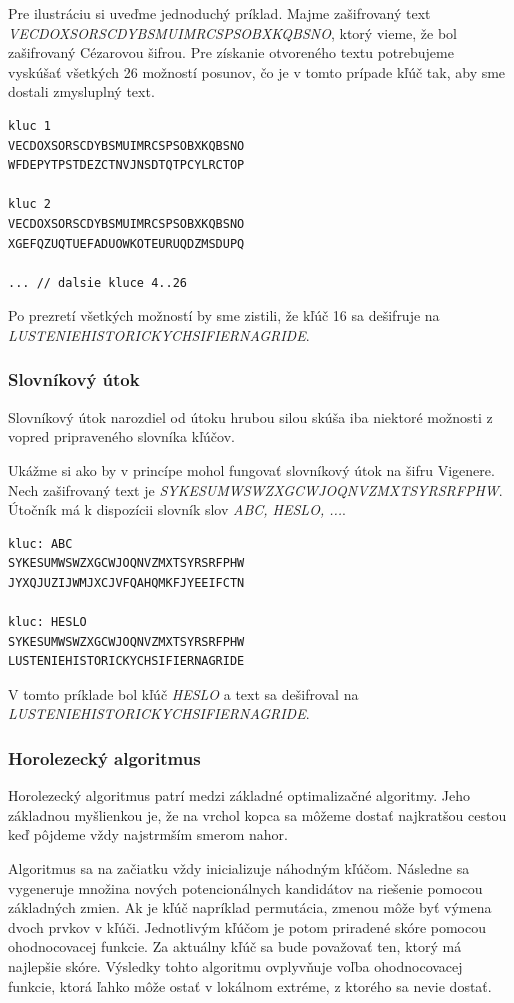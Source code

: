Pre ilustráciu si uveďme jednoduchý príklad. Majme zašifrovaný text \textit{VECDOXSORSCDYBSMUIMRCSPSOBXKQBSNO}, ktorý vieme,
že bol zašifrovaný Cézarovou šifrou.
Pre získanie otvoreného textu potrebujeme vyskúšať všetkých 26 možností posunov, čo je v tomto prípade kľúč tak, aby sme dostali zmysluplný text.

\begin{lstlisting}
kluc 1
VECDOXSORSCDYBSMUIMRCSPSOBXKQBSNO
WFDEPYTPSTDEZCTNVJNSDTQTPCYLRCTOP
  
kluc 2
VECDOXSORSCDYBSMUIMRCSPSOBXKQBSNO
XGEFQZUQTUEFADUOWKOTEURUQDZMSDUPQ

... // dalsie kluce 4..26
\end{lstlisting}

Po prezretí všetkých možností by sme zistili, že kľúč 16 sa dešifruje na \textit{LUSTENIEHISTORICKYCHSIFIERNAGRIDE}.

\subsubsection{Slovníkový útok}
Slovníkový útok narozdiel od útoku hrubou silou skúša iba niektoré možnosti z vopred pripraveného slovníka kľúčov.

Ukážme si ako by v princípe mohol fungovať slovníkový útok na šifru Vigenere.
Nech zašifrovaný text je \textit{SYKESUMWSWZXGCWJOQNVZMXTSYRSRFPHW}. Útočník má k dispozícii slovník slov \textit{ABC, HESLO, ...}.

\begin{lstlisting}
kluc: ABC
SYKESUMWSWZXGCWJOQNVZMXTSYRSRFPHW
JYXQJUZIJWMJXCJVFQAHQMKFJYEEIFCTN

kluc: HESLO
SYKESUMWSWZXGCWJOQNVZMXTSYRSRFPHW
LUSTENIEHISTORICKYCHSIFIERNAGRIDE
\end{lstlisting}

V tomto príklade bol kľúč \textit{HESLO} a text sa dešifroval na \textit{LUSTENIEHISTORICKYCHSIFIERNAGRIDE}.
\subsubsection{Horolezecký algoritmus}
Horolezecký algoritmus patrí medzi základné optimalizačné algoritmy.
Jeho základnou myšlienkou je, že na vrchol kopca sa môžeme dostať najkratšou cestou keď pôjdeme vždy najstrmším smerom nahor.

Algoritmus sa na začiatku vždy inicializuje náhodným kľúčom. Následne sa vygeneruje množina nových potencionálnych kandidátov na riešenie
pomocou základných zmien. Ak je kľúč napríklad permutácia, zmenou môže byť výmena dvoch prvkov v kľúči.
Jednotlivým kľúčom je potom priradené skóre pomocou ohodnocovacej funkcie.
Za aktuálny kľúč sa bude považovať ten, ktorý má najlepšie skóre.
Výsledky tohto algoritmu ovplyvňuje voľba ohodnocovacej funkcie, ktorá ľahko môže ostať v lokálnom extréme, z ktorého sa nevie dostať.

